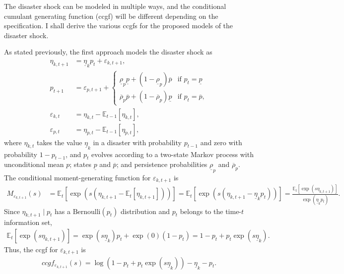\documentclass[12 pt, oneside]{article}
\theoremstyle{definition}
\theoremstyle{definition}
\theoremstyle{definition}
\newcommand{\E}{\mathbb{E}}
\begin{document}
The disaster shock can be modeled in multiple ways, and the conditional cumulant generating function (ccgf) will be different depending on the specification. I shall derive the various ccgfs for the proposed models of the disaster shock.

As stated previously, the first approach models the disaster shock as
\begin{align}
  \eta_{k, t + 1} & = \underline{\eta}_k p_t + \varepsilon_{k, t + 1},\\
  p_{t + 1} & = \varepsilon_{p, t + 1} + \begin{cases}
    \underline{\rho}_p \underline{p} + (1 - \underline{\rho}_p) \overline{p} & \text{if } p_t = \underline{p}\\
    \overline{\rho}_p \overline{p} + (1 - \overline{\rho}_p) \underline{p} & \text{if } p_t = \overline{p},
  \end{cases}\\
  \varepsilon_{k, t} & = \eta_{k, t} - \E_{t- 1}[\eta_{k, t}],\\
  \varepsilon_{p, t} & = \eta_{p, t} - \E_{t - 1}[\eta_{p, t}],
\end{align}
where $\eta_{k, t}$ takes the value $\underline{\eta}_k$ in a disaster with probability $p_{t - 1}$ and zero with probability $1 - p_{t - 1}$, and $p_t$ evolves according to a two-state Markov process with unconditional mean $p$; states $\underline{p}$ and $\overline{p}$; and persistence probabilities $\underline{\rho}_p$ and $\overline{\rho}_p$. The conditional moment-generating function for $\varepsilon_{k, t + 1}$ is
\begin{align*}
  M_{\varepsilon_{k, t + 1}}(s) & = \E_t[\exp(s (\eta_{k, t + 1} - \E_t[\eta_{k, t + 1}]))] = \E_t[\exp(s (\eta_{k, t + 1} - \underline{\eta}_k p_t))] = \frac{\E_t[\exp(s \eta_{k, t + 1})]}{\exp(\underline{\eta}_kp_t)}.
\end{align*}
Since $\eta_{k, t + 1} \mid p_t$ has a $\text{Bernoulli}(p_t)$ distribution and $p_t$ belongs to the time-$t$ information set,
\begin{align*}
  \E_t[\exp(s\eta_{k, t + 1})] = \exp(s \underline{\eta}_k)p_t + \exp(0)(1 - p_t) = 1 - p_t + p_t\exp(s \underline{\eta}_k).
\end{align*}
Thus, the ccgf for $\varepsilon_{k, t + 1}$ is
\begin{align}\label{eq:ccgf bernoulli disaster indicator}
  ccgf_{\varepsilon_{k, t + 1}}(s) = \log(1 - p_t + p_t \exp(s \underline{\eta}_k)) - \underline{\eta}_k - p_t.
\end{align}
\end{document}
